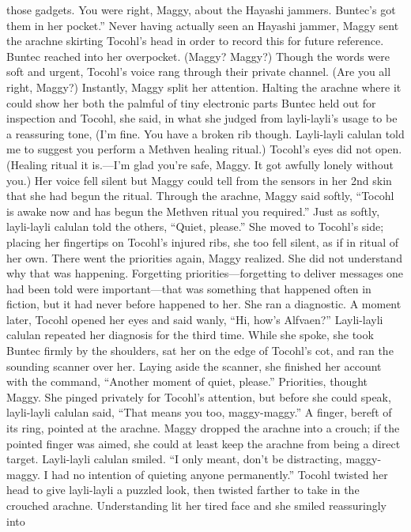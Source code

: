 \documentclass[9pt]{article}
\begin{document}
those gadgets. You were right, Maggy, about the Hayashi jammers. Buntec’s got them in her pocket.”
Never having actually seen an Hayashi jammer, Maggy sent the arachne skirting Tocohl’s head in
order to record this for future reference. Buntec reached into her overpocket.
(Maggy? Maggy?) Though the words were soft and urgent, Tocohl’s voice rang through their private
channel. (Are you all right, Maggy?)
Instantly, Maggy split her attention. Halting the arachne where it could show her both the palmful of
tiny electronic parts Buntec held out for inspection and Tocohl, she said, in what she judged from
layli-layli’s usage to be a reassuring tone, (I’m fine. You have a broken rib though. Layli-layli calulan
told me to suggest you perform a Methven healing ritual.)
Tocohl’s eyes did not open. (Healing ritual it is.—I’m glad you’re safe, Maggy. It got awfully lonely
without you.) Her voice fell silent but Maggy could tell from the sensors in her 2nd skin that she had
begun the ritual.
Through the arachne, Maggy said softly, “Tocohl is awake now and has begun the Methven ritual
you required.”
Just as softly, layli-layli calulan told the others, “Quiet, please.” She moved to Tocohl’s side;
placing her fingertips on Tocohl’s injured ribs, she too fell silent, as if in ritual of her own.
There went the priorities again, Maggy realized. She did not understand why that was happening.
Forgetting priorities—forgetting to deliver messages one had been told were important—that was
something that happened often in fiction, but it had never before happened to her. She ran a diagnostic.
A moment later, Tocohl opened her eyes and said wanly, “Hi, how’s Alfvaen?”
Layli-layli calulan repeated her diagnosis for the third time. While she spoke, she took Buntec
firmly by the shoulders, sat her on the edge of Tocohl’s cot, and ran the sounding scanner over her.
Laying aside the scanner, she finished her account with the command, “Another moment of quiet,
please.”
Priorities, thought Maggy. She pinged privately for Tocohl’s attention, but before she could speak,
layli-layli calulan said, “That means you too, maggy-maggy.” A finger, bereft of its ring, pointed at the
arachne. Maggy dropped the arachne into a crouch; if the pointed finger was aimed, she could at least
keep the arachne from being a direct target.
Layli-layli calulan smiled. “I only meant, don’t be distracting, maggy-maggy. I had no intention of
quieting anyone permanently.” Tocohl twisted her head to give layli-layli a puzzled look, then twisted
farther to take in the crouched arachne. Understanding lit her tired face and she smiled reassuringly into
\end{document}
